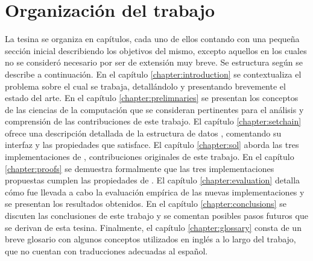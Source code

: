   \section{Organización del trabajo}
  La tesina se organiza en capítulos, cada uno de ellos contando con una pequeña sección inicial
  describiendo los objetivos del mismo, excepto aquellos en los cuales no se consideró necesario por
  ser de extensión muy breve.
  Se estructura según se describe a continuación.
  En el capítulo \ref{chapter:introduction} se
  contextualiza el problema sobre el cual se trabaja, detallándolo y presentando brevemente
  el estado del arte.
  En el capítulo \ref{chapter:prelimnaries} se presentan los conceptos de las ciencias de la computación que se
  consideran pertinentes para el análisis y comprensión de las contribuciones de este trabajo.
  El capítulo \ref{chapter:setchain} ofrece una descripción detallada de la estructura de datos \setchain,
  comentando su interfaz y las propiedades que satisface.
  El capítulo \ref{chapter:sol} aborda las tres implementaciones de \setchain, contribuciones originales
  de este trabajo.
  En el capítulo \ref{chapter:proofs} se demuestra formalmente que las tres implementaciones propuestas
  cumplen las propiedades de \setchain.
  El capítulo \ref{chapter:evaluation} detalla cómo fue llevada a cabo la evaluación empírica de las
  nuevas implementaciones y se presentan los resultados obtenidos.
  En el capítulo \ref{chapter:conclusions} se discuten las conclusiones de este trabajo y 
  se comentan posibles pasos futuros que se derivan de esta tesina.
  Finalmente, el capítulo \ref{chapter:glossary} consta de un breve glosario con algunos conceptos
  utilizados en inglés a lo largo del trabajo, que no cuentan con traducciones adecuadas al español.

